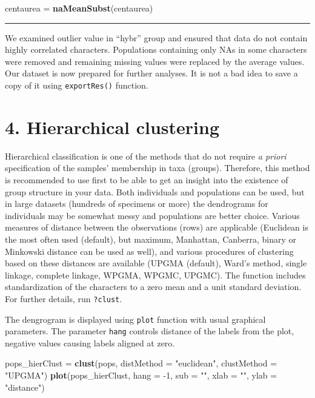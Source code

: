 \documentclass[
]{article}
\newenvironment{Shaded}{\begin{snugshade}}{\end{snugshade}}
\newcommand{\DataTypeTok}[1]{\textcolor[rgb]{0.13,0.29,0.53}{#1}}
\newcommand{\DecValTok}[1]{\textcolor[rgb]{0.00,0.00,0.81}{#1}}
\newcommand{\KeywordTok}[1]{\textcolor[rgb]{0.13,0.29,0.53}{\textbf{#1}}}
\newcommand{\NormalTok}[1]{#1}
\newcommand{\StringTok}[1]{\textcolor[rgb]{0.31,0.60,0.02}{#1}}
\begin{document}
\begin{Shaded}
\begin{Highlighting}[]
\NormalTok{centaurea =}\StringTok{ }\KeywordTok{naMeanSubst}\NormalTok{(centaurea)}
\end{Highlighting}
\end{Shaded}

\begin{center}\rule{0.5\linewidth}{0.5pt}\end{center}

We examined outlier value in ``hybr'' group and ensured that data do not
contain highly correlated characters. Populations containing only NAs in
some characters were removed and remaining missing values were replaced
by the average values. Our dataset is now prepared for further analyses.
It is not a bad idea to save a copy of it using \texttt{exportRes()}
function.

\hypertarget{hierarchical-clustering}{%
\section{4. Hierarchical clustering}\label{hierarchical-clustering}}

Hierarchical classification is one of the methods that do not require
\emph{a priori} specification of the samples' membership in taxa
(groups). Therefore, this method is recommended to use first to be able
to get an insight into the existence of group structure in your data.
Both individuals and populations can be used, but in large datasets
(hundreds of specimens or more) the dendrograms for individuals may be
somewhat messy and populations are better choice. Various measures of
distance between the observations (rows) are applicable (Euclidean is
the most often used (default), but maximum, Manhattan, Canberra, binary
or Minkowski distance can be used as well), and various procedures of
clustering based on these distances are available (UPGMA (default),
Ward's method, single linkage, complete linkage, WPGMA, WPGMC, UPGMC).
The function includes standardization of the characters to a zero mean
and a unit standard deviation. For further details, run \texttt{?clust}.

The dengrogram is displayed using \texttt{plot} function with usual
graphical parameters. The parameter \texttt{hang} controls distance of
the labels from the plot, negative values causing labels aligned at
zero.

\begin{Shaded}
\begin{Highlighting}[]
\NormalTok{pops_hierClust =}\StringTok{ }\KeywordTok{clust}\NormalTok{(pops, }\DataTypeTok{distMethod =} \StringTok{"euclidean"}\NormalTok{, }\DataTypeTok{clustMethod =} \StringTok{"UPGMA"}\NormalTok{)}
\KeywordTok{plot}\NormalTok{(pops_hierClust, }\DataTypeTok{hang =} \DecValTok{-1}\NormalTok{, }\DataTypeTok{sub =} \StringTok{""}\NormalTok{, }\DataTypeTok{xlab =} \StringTok{""}\NormalTok{, }\DataTypeTok{ylab =} \StringTok{"distance"}\NormalTok{)}
\end{Highlighting}
\end{Shaded}
\end{document}
